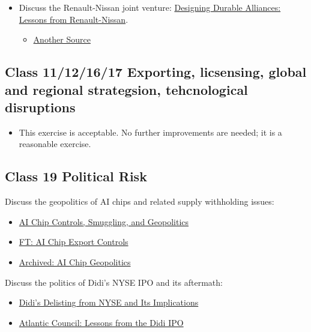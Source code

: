 \documentclass[
  11pt,
]{article}
\providecommand{\tightlist}{%
  \setlength{\itemsep}{0pt}\setlength{\parskip}{0pt}}
\begin{document}
\begin{itemize}
\tightlist
\item
  Discuss the Renault-Nissan joint venture:
  \href{https://knowledge.insead.edu/strategy/designing-durable-alliances-lessons-renault-nissan}{Designing
  Durable Alliances: Lessons from Renault-Nissan}.

  \begin{itemize}
  \tightlist
  \item
    \href{https://archive.ph/khRN8\#selection-1399.13-1419.71}{Another
    Source}
  \end{itemize}
\end{itemize}

\subsection{Class 11/12/16/17 Exporting, licsensing, global and regional
strategsion, tehcnological
disruptions}\label{class-11121617-exporting-licsensing-global-and-regional-strategsion-tehcnological-disruptions}

\begin{itemize}
\tightlist
\item
  This exercise is acceptable. No further improvements are needed; it is
  a reasonable exercise.
\end{itemize}

\subsection{Class 19 Political Risk}\label{class-19-political-risk}

Discuss the geopolitics of AI chips and related supply withholding
issues:

\begin{itemize}
\tightlist
\item
  \href{https://www.eetimes.com/ai-chip-controls-smuggling-and-geopolitics/}{AI
  Chip Controls, Smuggling, and Geopolitics}
\item
  \href{https://www.ft.com/content/a13ba438-3b43-46dd-b332-4b81b3644da0}{FT:
  AI Chip Export Controls}
\item
  \href{https://archive.ph/jcX8b\#selection-1999.6-2003.36}{Archived: AI
  Chip Geopolitics}
\end{itemize}

Discuss the politics of Didi's NYSE IPO and its aftermath:

\begin{itemize}
\tightlist
\item
  \href{https://www.europeanguanxi.com/post/didi-s-delisting-from-nyse-and-its-implications-explained}{Didi's
  Delisting from NYSE and Its Implications}
\item
  \href{https://www.atlanticcouncil.org/content-series/inflection-points/lessons-from-the-didi-ipo-ride-xi-faces-a-tradeoff-between-economic-dynamism-and-authoritarian-grip/}{Atlantic
  Council: Lessons from the Didi IPO}
\end{itemize}
\end{document}
